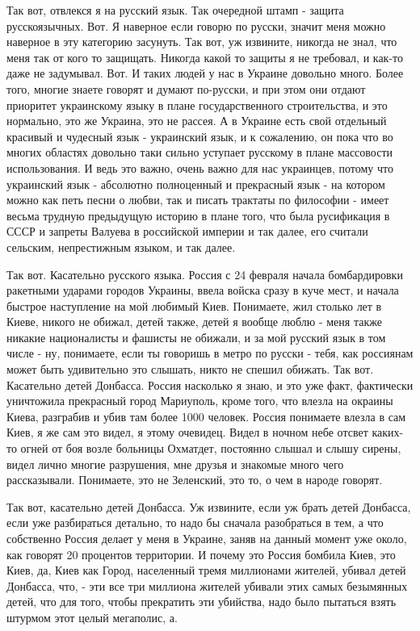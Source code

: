 Так вот, отвлекся я на русский язык. Так очередной штамп - защита
русскоязычных. Вот. Я наверное если говорю по русски, значит меня можно
наверное в эту категорию засунуть. Так вот, уж извините, никогда не знал, что
меня так от кого то защищать. Никогда какой то защиты я не требовал, и как-то
даже не задумывал. Вот. И таких людей у нас в Украине довольно много. Более
того, многие знаете говорят и думают по-русски, и при этом они отдают приоритет
украинскому языку в плане государственного строительства, и это нормально, это
же Украина, это не рассея. А в Украине есть свой отдельный красивый и чудесный
язык - украинский язык, и к сожалению, он пока что во многих областях довольно
таки сильно уступает русскому в плане массовости использования. И ведь это
важно, очень важно для нас украинцев, потому что украинский язык - абсолютно
полноценный и прекрасный язык - на котором можно как петь песни о любви, так и
писать трактаты по философии - имеет весьма трудную предыдущую историю в плане
того, что была русификация в СССР и запреты Валуева в российской империи и так
далее, его считали сельским, непрестижным языком, и так далее.

Так вот. Касательно русского языка. Россия с 24 февраля начала бомбардировки
ракетными ударами городов Украины, ввела войска сразу в куче мест, и начала
быстрое наступление на мой любимый Киев. Понимаете, жил столько лет в Киеве,
никого не обижал, детей также, детей я вообще люблю - меня также никакие
националисты и фашисты не обижали, и за мой русский язык в том числе - ну,
понимаете, если ты говоришь в метро по русски - тебя, как россиянам может быть
удивительно это слышать, никто не спешил обижать. Так вот. Касательно детей
Донбасса. Россия насколько я знаю, и это уже факт, фактически уничтожила
прекрасный город Мариуполь, кроме того, что влезла на окраины Киева, разграбив
и убив там более 1000 человек. Россия понимаете влезла в сам Киев, я же сам это
видел, я этому очевидец. Видел в ночном небе отсвет каких-то огней от боя возле
больницы Охматдет, постоянно слышал и слышу сирены, видел лично многие
разрушения, мне друзья и знакомые много чего рассказывали. Понимаете, это не
Зеленский, это то, о чем в народе говорят.

Так вот, касательно детей Донбасса. Уж извините, если уж брать детей Донбасса,
если уже разбираться детально, то надо бы сначала разобраться в тем, а что
собственно Россия делает у меня в Украине, заняв на данный момент уже около,
как говорят 20 процентов территории. И почему это Россия бомбила Киев, это
Киев, да, Киев как Город, населенный тремя миллионами жителей, убивал детей
Донбасса, что, - эти все три миллиона жителей убивали этих самых безымянных
детей, что для того, чтобы прекратить эти убийства, надо было пытаться взять
штурмом этот целый мегаполис, а.

